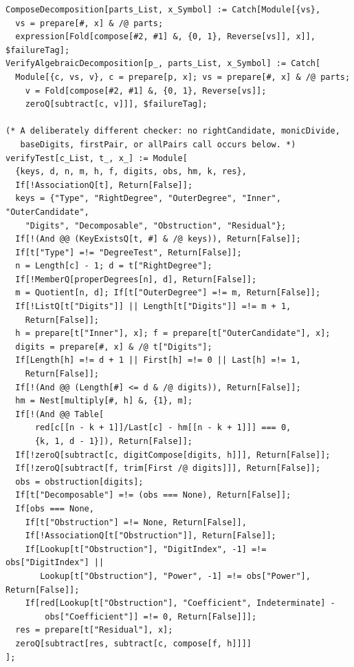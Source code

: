 \documentclass[11pt,a4paper]{article}
\numberwithin{equation}{section}
\theoremstyle{definition}
\theoremstyle{remark}
\begin{document}
\begin{lstlisting}
ComposeDecomposition[parts_List, x_Symbol] := Catch[Module[{vs},
  vs = prepare[#, x] & /@ parts;
  expression[Fold[compose[#2, #1] &, {0, 1}, Reverse[vs]], x]], $failureTag];
VerifyAlgebraicDecomposition[p_, parts_List, x_Symbol] := Catch[
  Module[{c, vs, v}, c = prepare[p, x]; vs = prepare[#, x] & /@ parts;
    v = Fold[compose[#2, #1] &, {0, 1}, Reverse[vs]];
    zeroQ[subtract[c, v]]], $failureTag];

(* A deliberately different checker: no rightCandidate, monicDivide,
   baseDigits, firstPair, or allPairs call occurs below. *)
verifyTest[c_List, t_, x_] := Module[
  {keys, d, n, m, h, f, digits, obs, hm, k, res},
  If[!AssociationQ[t], Return[False]];
  keys = {"Type", "RightDegree", "OuterDegree", "Inner", "OuterCandidate",
    "Digits", "Decomposable", "Obstruction", "Residual"};
  If[!(And @@ (KeyExistsQ[t, #] & /@ keys)), Return[False]];
  If[t["Type"] =!= "DegreeTest", Return[False]];
  n = Length[c] - 1; d = t["RightDegree"];
  If[!MemberQ[properDegrees[n], d], Return[False]];
  m = Quotient[n, d]; If[t["OuterDegree"] =!= m, Return[False]];
  If[!ListQ[t["Digits"]] || Length[t["Digits"]] =!= m + 1,
    Return[False]];
  h = prepare[t["Inner"], x]; f = prepare[t["OuterCandidate"], x];
  digits = prepare[#, x] & /@ t["Digits"];
  If[Length[h] =!= d + 1 || First[h] =!= 0 || Last[h] =!= 1,
    Return[False]];
  If[!(And @@ (Length[#] <= d & /@ digits)), Return[False]];
  hm = Nest[multiply[#, h] &, {1}, m];
  If[!(And @@ Table[
      red[c[[n - k + 1]]/Last[c] - hm[[n - k + 1]]] === 0,
      {k, 1, d - 1}]), Return[False]];
  If[!zeroQ[subtract[c, digitCompose[digits, h]]], Return[False]];
  If[!zeroQ[subtract[f, trim[First /@ digits]]], Return[False]];
  obs = obstruction[digits];
  If[t["Decomposable"] =!= (obs === None), Return[False]];
  If[obs === None,
    If[t["Obstruction"] =!= None, Return[False]],
    If[!AssociationQ[t["Obstruction"]], Return[False]];
    If[Lookup[t["Obstruction"], "DigitIndex", -1] =!= obs["DigitIndex"] ||
       Lookup[t["Obstruction"], "Power", -1] =!= obs["Power"], Return[False]];
    If[red[Lookup[t["Obstruction"], "Coefficient", Indeterminate] -
        obs["Coefficient"]] =!= 0, Return[False]]];
  res = prepare[t["Residual"], x];
  zeroQ[subtract[res, subtract[c, compose[f, h]]]]
];


\end{lstlisting}
\end{document}

